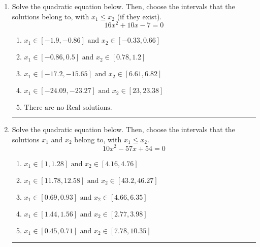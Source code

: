 \documentclass[14pt]{extbook}
\newcommand{\litem}[1]{\item#1\hspace*{-1cm}\rule{\textwidth}{0.4pt}}
\begin{document}
\begin{enumerate}
{\begin{enumerate}[label=\Alph*.]
\end{enumerate} }
\litem{
Solve the quadratic equation below. Then, choose the intervals that the solutions belong to, with $x_1 \leq x_2$ (if they exist).\[ 16x^{2} +10 x -7 = 0 \]\begin{enumerate}[label=\Alph*.]
\item \( x_1 \in [-1.9, -0.86] \text{ and } x_2 \in [-0.33, 0.66] \)
\item \( x_1 \in [-0.86, 0.5] \text{ and } x_2 \in [0.78, 1.2] \)
\item \( x_1 \in [-17.2, -15.65] \text{ and } x_2 \in [6.61, 6.82] \)
\item \( x_1 \in [-24.09, -23.27] \text{ and } x_2 \in [23, 23.38] \)
\item \( \text{There are no Real solutions.} \)

\end{enumerate} }
\litem{
Solve the quadratic equation below. Then, choose the intervals that the solutions $x_1$ and $x_2$ belong to, with $x_1 \leq x_2$.\[ 10x^{2} -57 x + 54 = 0 \]\begin{enumerate}[label=\Alph*.]
\item \( x_1 \in [1, 1.28] \text{ and } x_2 \in [4.16, 4.76] \)
\item \( x_1 \in [11.78, 12.58] \text{ and } x_2 \in [43.2, 46.27] \)
\item \( x_1 \in [0.69, 0.93] \text{ and } x_2 \in [4.66, 6.35] \)
\item \( x_1 \in [1.44, 1.56] \text{ and } x_2 \in [2.77, 3.98] \)
\item \( x_1 \in [0.45, 0.71] \text{ and } x_2 \in [7.78, 10.35] \)


\end{enumerate}}
\end{enumerate}
\end{document}
